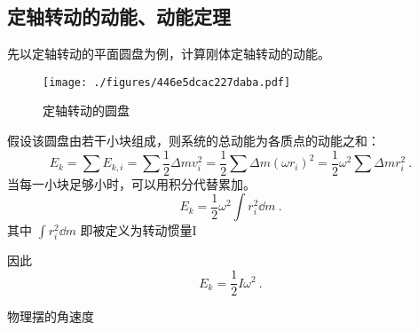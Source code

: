 
\begin{issues}
\issueDraft
{}
\end{issues}


\subsection{定轴转动的动能、动能定理}
先以定轴转动的平面圆盘为例，计算刚体定轴转动的动能。
\begin{figure}[ht]
\centering
\texttt{[image: ./figures/446e5dcac227daba.pdf]}
\caption{定轴转动的圆盘} \label{fig_RigEng_1}
\end{figure}
假设该圆盘由若干小块组成，则系统的总动能为各质点的动能之和：
\begin{equation}
E_k=\sum E_{k,i}=\sum \frac{1}{2} \Delta m v_i^2=\frac{1}{2} \sum \Delta m (\omega r_i)^2=\frac{1}{2} \omega^2 \sum \Delta m r_i^2~.
\end{equation}
当每一小块足够小时，可以用积分代替累加。
\begin{equation}
E_k=\frac{1}{2} \omega^2 \int r_i^2 \dd m ~.
\end{equation}
其中 $\int r_i^2 \dd m$ 即被定义为转动惯量I

因此
\begin{equation}
E_k=\frac{1}{2} I \omega^2~.
\end{equation}


\begin{example}{物理摆的角速度}\label{ex_RigEng_1}
\end{example}
